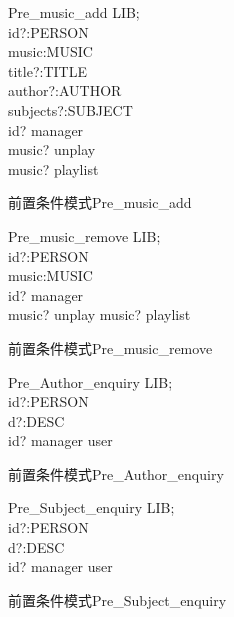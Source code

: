 \documentclass[14pt]{article}
\numberwithin{figure}{subsection}
\begin{document}
\begin{figure}[H]
    \setlength{\abovecaptionskip}{0.cm}
    \setlength{\belowcaptionskip}{0.cm}
    \begin{schema}{Pre\_music\_add}
        LIB;\\
        id?:PERSON\\
        music:MUSIC\\
        title?:TITLE\\
        author?:\ndres AUTHOR\\
        subjects?:\ndres SUBJECT\\
        \where
        id? \in manager\\
        music? \not \in unplay\\
        music? \not \in playlist
    \end{schema}
    \caption{前置条件模式Pre\_music\_add}
\end{figure}
\vspace{-1cm}
\begin{figure}[H]
    \setlength{\abovecaptionskip}{0.cm}
    \setlength{\belowcaptionskip}{0.cm}
    \begin{schema}{Pre\_music\_remove}
        LIB;\\
        id?:PERSON\\
        music:MUSIC\\
        \where
        id? \in manager\\
        music?  \in unplay
        music?  \in playlist
    \end{schema}
    \caption{前置条件模式Pre\_music\_remove}
\end{figure}
\vspace{-1cm}
\begin{figure}[H]
    \setlength{\abovecaptionskip}{0.cm}
    \setlength{\belowcaptionskip}{0.cm}
    \begin{schema}{Pre\_Author\_enquiry}
        LIB;\\
        id?:PERSON\\
        d?:DESC\\
        \where
        id? \in manager \cup user
    \end{schema}
    \caption{前置条件模式Pre\_Author\_enquiry}
\end{figure}
\vspace{-1cm}
\begin{figure}[H]
    \setlength{\abovecaptionskip}{0.cm}
    \setlength{\belowcaptionskip}{0.cm}
    \begin{schema}{Pre\_Subject\_enquiry}
        LIB;\\
        id?:PERSON\\
        d?:DESC\\
        \where
        id? \in manager \cup user
    \end{schema}
    \caption{前置条件模式Pre\_Subject\_enquiry}
\end{figure}
\end{document}
